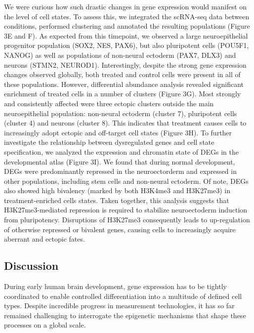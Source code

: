 We were curious how such drastic changes in gene expression would manifest on the level of cell states. To assess this, we integrated the scRNA-seq data between conditions, performed clustering and annotated the resulting populations (Figure 3E and F). As expected from this timepoint, we  observed a large neuroepithelial progenitor population (SOX2, NES, PAX6), but also pluripotent cells (POU5F1, NANOG) as well as populations of non-neural ectoderm (PAX7, DLX3) and neurons (STMN2, NEUROD1). Interestingly, despite the strong gene expression changes observed globally, both treated and control cells were present in all of these populations. However, differential abundance analysis revealed significant enrichment of treated cells in a number of clusters (Figure 3G). Most strongly and consistently affected were three ectopic clusters outside the main neuroepithelial population: non-neural ectoderm (cluster 7), pluripotent cells (cluster 4) and neurons (cluster 8). This indicates that treatment causes cells to increasingly adopt ectopic and off-target cell states (Figure 3H). To further investigate the relationship between dysregulated genes and cell state specification, we analyzed the expression and chromatin state of DEGs in the developmental atlas (Figure 3I). We found that during normal development, DEGs were predominantly repressed in the neuroectorderm and expressed in other populations, including stem cells and non-neural ectoderm. Of note, DEGs also showed high bivalency (marked by both H3K4me3 and H3K27me3) in treatment-enriched cells states. Taken together, this analysis suggests that H3K27me3-mediated repression is required to stabilize neuroectoderm induction from pluripotency. Disruptions of H3K27me3 consequently leads to up-regulation of otherwise repressed or bivalent genes, causing cells to increasingly acquire aberrant and ectopic fates. 


\subsection{Discussion}
During early human brain development, gene expression has to be tightly coordinated to enable controlled differentiation into a multitude of defined cell types. Despite incredible progress in measurement technologies, it has so far remained challenging to interrogate the epigenetic mechanisms that shape these processes on a global scale. 

